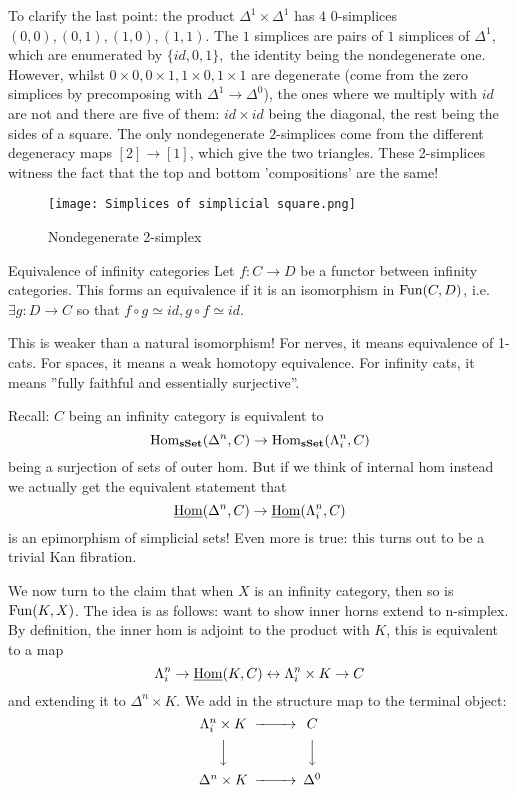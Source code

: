 To clarify the last point: the product $\Delta^1 \times\Delta^1$ has $4$ $0$-simplices $(0,0), (0,1), (1,0), (1,1)$. The $1$ simplices are pairs of $1$ simplices of $\Delta^1$, which are enumerated by $\{id, 0,1\},$ the identity being the nondegenerate one. However, whilst $0\times 0, 0\times 1, 1\times 0, 1\times 1$ are degenerate (come from the zero simplices by precomposing with $\Delta^1 \rightarrow \Delta^0$), the ones where we multiply with $id$ are not and there are five of them: $id\times id$ being the diagonal, the rest being the sides of a square. The only nondegenerate $2$-simplices come from the different degeneracy maps $[2]\rightarrow [1]$, which give the two triangles. These 2-simplices witness the fact that the top and bottom 'compositions' are the same!

\begin{figure}[H]
    \centering
        \texttt{[image: Simplices of simplicial square.png]}
        \caption{Nondegenerate 2-simplex}
    \end{figure}

\begin{definition}{Equivalence of infinity categories}{}
    Let $f:C\rightarrow D$ be a functor between infinity categories. This forms an equivalence if it is an isomorphism in $\mathrm{Fun}(C,D)$, i.e. $\exists g:D\rightarrow C$ so that $f\circ g \simeq id, g\circ f\simeq id$. 
\end{definition} 


This is weaker than a natural isomorphism! For nerves, it means equivalence of 1-cats. For spaces, it means a weak homotopy equivalence. For infinity cats, it means ''fully faithful and essentially surjective''.

Recall: $C$ being an infinity category is equivalent to $$\operatorname{Hom}_{\operatorname{\mathbf{sSet}}}(\Delta^n,C)\rightarrow \operatorname{Hom}_{\operatorname{\mathbf{sSet}}}(\Lambda^n_i,C)$$being a surjection of sets of outer hom. But if we think of internal hom instead we actually get the equivalent statement that$$\underline{\operatorname{Hom}} (\Delta^n,C)\rightarrow \underline{\operatorname{Hom}} (\Lambda^n_i,C)$$is an epimorphism of simplicial sets! Even more is true: this turns out to be a trivial Kan fibration.

We now turn to the claim that when $X$ is an infinity category, then so is $\mathrm{Fun}(K,X)$. The idea is as follows: want to show inner horns extend to n-simplex. By definition, the inner hom is adjoint to the product with $K$, this is equivalent to a map $$\Lambda^n_i\rightarrow \underline{\operatorname{Hom}}(K,C)\leftrightarrow \Lambda^n_i\times K\rightarrow C$$ and extending it to $\Delta^n\times K$. We add in the structure map to the terminal object: $$\begin{CD}\Lambda^n_i\times K @>>>C \\ @VVV @VVV \\ \Delta^n\times K @>>> \Delta^0\end{CD}$$

